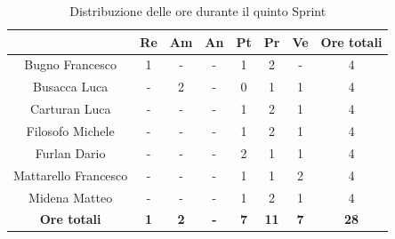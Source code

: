 \begin{table}[H]
  \centering
  \renewcommand{\arraystretch}{1.8}
  \begin{tabular}{c|c|c|c|c|c|c|c}
    \rowcolor[HTML]{125E28}
    \multicolumn{1}{c}{\color[HTML]{FFFFFF}\textbf{ Nominativo }}
                         & \multicolumn{1}{c}{\color[HTML]{FFFFFF}\textbf{ Re }}
                         & \multicolumn{1}{c}{\color[HTML]{FFFFFF}\textbf{ Am}}
                         & \multicolumn{1}{c}{\color[HTML]{FFFFFF}\textbf{ An }}
                         & \multicolumn{1}{c}{\color[HTML]{FFFFFF}\textbf{ Pt }}
                         & \multicolumn{1}{c}{\color[HTML]{FFFFFF}\textbf{ Pr }}
                         & \multicolumn{1}{c}{\color[HTML]{FFFFFF}\textbf{ Ve }}
                         & \multicolumn{1}{c}{\color[HTML]{FFFFFF}\textbf{ Ore totali }}                                                                                 \\
    \hline
    Bugno Francesco      & 1                                                             & -          & -          & 1          & 2           & -          & 4           \\
    Busacca Luca         & -                                                             & 2          & -          & 0          & 1           & 1          & 4           \\
    Carturan Luca        & -                                                             & -          & -          & 1          & 2           & 1          & 4           \\
    Filosofo Michele     & -                                                             & -          & -          & 1          & 2           & 1          & 4           \\
    Furlan Dario         & -                                                             & -          & -          & 2          & 1           & 1          & 4           \\
    Mattarello Francesco & -                                                             & -          & -          & 1          & 1           & 2          & 4           \\
    Midena Matteo        & -                                                             & -          & -          & 1          & 2           & 1          & 4           \\
    \textbf{Ore totali}  & \textbf{1}                                                    & \textbf{2} & \textbf{-} & \textbf{7} & \textbf{11} & \textbf{7} & \textbf{28}
  \end{tabular}
  \caption{Distribuzione delle ore durante il quinto Sprint}
\end{table}

